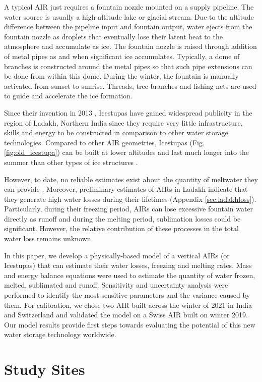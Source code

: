\documentclass[utf8]{frontiersSCNS} %
\begin{document}
A typical AIR just requires a fountain nozzle mounted on a supply pipeline. The water source is usually a high altitude
lake or glacial stream. Due to the altitude difference between the pipeline input and fountain output, water ejects from
the fountain nozzle as droplets that eventually lose their latent heat to the atmosphere and accumulate as ice. The
fountain nozzle is raised through addition of metal pipes as and when significant ice accumulates.  Typically, a dome of
branches is constructed around the metal pipes so that such pipe extensions can be done from within this dome. During
the winter, the fountain is manually activated from sunset to sunrise. Threads, tree branches and fishing nets are used
to guide and accelerate the ice formation.

Since their invention in 2013 \citep{campaign}, Icestupas have gained widespread publicity in the region of Ladakh,
Northern India since they require very little infrastructure, skills and energy to be constructed in comparison to other
water storage technologies. Compared to other AIR geometries, Icestupas (Fig. \ref{fig:old_icestupa}) can be built
at lower altitudes and last much longer into the summer than other types of ice structures \citep{campaign}.

However, to date, no reliable estimates exist about the quantity of meltwater they can provide \citep{Nusser_2018}
. Moreover, preliminary estimates of AIRs in Ladakh indicate that they generate high water losses during their lifetimes
(Appendix \ref{sec:ladakhloss}). Particularly, during their freezing period, AIRs can lose excessive fountain water
directly as runoff and during the melting period, sublimation losses could be significant.  However, the relative
contribution of these processes in the total water loss remains unknown.

In this paper, we develop a physically-based model of a vertical AIRs (or Icestupas) that can estimate their water
losses, freezing and melting rates. Mass and energy balance equations were used to estimate the quantity of water
frozen, melted, sublimated and runoff. Sensitivity and uncertainty analysis were performed to identify the most
sensitive parameters and the variance caused by them. For calibration, we chose two AIR built across the winter of
2021 in India and Switzerland and validated the model on a Swiss AIR built on winter 2019. Our model results
provide first steps towards evaluating the potential of this new water storage technology worldwide.

\section{Study Sites}
\end{document}

